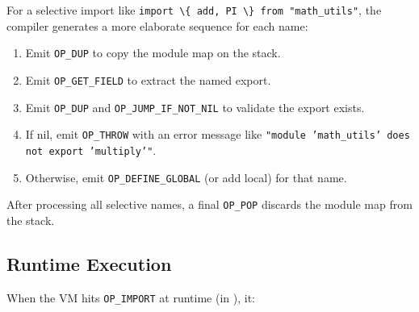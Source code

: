 For a selective import like \lstinline|import \{ add, PI \} from "math_utils"|, the compiler generates a more elaborate sequence for each name:

\begin{enumerate}[nosep]
  \item Emit \lstinline|OP_DUP| to copy the module map on the stack.
  \item Emit \lstinline|OP_GET_FIELD| to extract the named export.
  \item Emit \lstinline|OP_DUP| and \lstinline|OP_JUMP_IF_NOT_NIL| to validate the export exists.
  \item If nil, emit \lstinline|OP_THROW| with an error message like \texttt{"module 'math\_utils' does not export 'multiply'"}.
  \item Otherwise, emit \lstinline|OP_DEFINE_GLOBAL| (or add local) for that name.
\end{enumerate}

After processing all selective names, a final \lstinline|OP_POP| discards the module map from the stack.

\subsection{Runtime Execution}\label{subsec:import-runtime}

When the VM hits \lstinline|OP_IMPORT| at runtime (in ), it:

